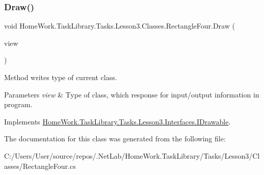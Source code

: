 \subsubsection{\texorpdfstring{Draw()}{Draw()}}
{\footnotesize\ttfamily void Home\+Work.\+Task\+Library.\+Tasks.\+Lesson3.\+Classes.\+Rectangle\+Four.\+Draw (\begin{DoxyParamCaption}\item[{I\+Information}]{view }\end{DoxyParamCaption})}



Method writes type of current class. 


\begin{DoxyParams}{Parameters}
{\em view} & Type of class, which response for input/output information in program.\\
\hline
\end{DoxyParams}


Implements \mbox{\hyperlink{interface_home_work_1_1_task_library_1_1_tasks_1_1_lesson3_1_1_interfaces_1_1_i_drawable_aa4df9dc24fb7a0eb689e4a8b0dc80b09}{Home\+Work.\+Task\+Library.\+Tasks.\+Lesson3.\+Interfaces.\+I\+Drawable}}.



The documentation for this class was generated from the following file\+:\begin{DoxyCompactItemize}
\item 
C\+:/\+Users/\+User/source/repos/.\+Net\+Lab/\+Home\+Work.\+Task\+Library/\+Tasks/\+Lesson3/\+Classes/Rectangle\+Four.\+cs\end{DoxyCompactItemize}
